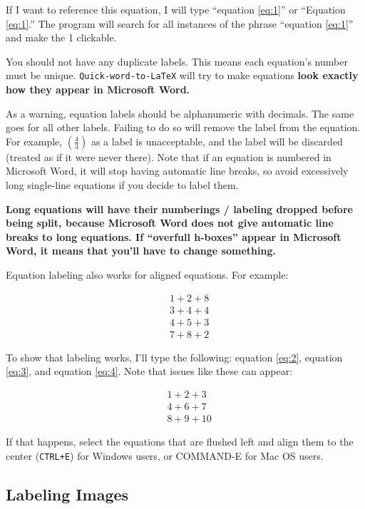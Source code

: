 \documentclass[
]{article}
\theoremstyle{plain}
\theoremstyle{remark}
\theoremstyle{definition}
\begin{document}
If I want to reference this equation, I will type ``equation \ref{eq:1}'' or
``Equation \ref{eq:1}.'' The program will search for all instances of the phrase
``equation \ref{eq:1}'' and make the 1 clickable.

You should not have any duplicate labels. This means each equation's
number must be unique. \texttt{Quick-word-to-LaTeX} will try to make
equations \textbf{look exactly how they appear in Microsoft Word.}

As a warning, equation labels should be alphanumeric with decimals. The
same goes for all other labels. Failing to do so will remove the label
from the equation. For example, \(\left( \frac{4}{3} \right)\) as a
label is unacceptable, and the label will be discarded (treated as if it
were never there). Note that if an equation is numbered in Microsoft
Word, it will stop having automatic line breaks, so avoid excessively
long single-line equations if you decide to label them.

\textbf{Long equations will have their numberings / labeling dropped
before being split, because Microsoft Word does not give automatic line
breaks to long equations. If ``overfull h-boxes'' appear in Microsoft
Word, it means that you'll have to change something.}

Equation labeling also works for aligned equations. For example:

\begin{align*}
&1 + 2 + 8\tag{2} \label{eq:2} \\
&3 + 4 + 4\tag{3} \label{eq:3} \\
&4 + 5 + 3 \\
&7 + 8 + 2\tag{4} \label{eq:4}
\end{align*}


To show that labeling works, I'll type the following: equation \ref{eq:2},
equation \ref{eq:3}, and equation \ref{eq:4}. Note that issues like these can appear:

\begin{align*}
&1 + 2 + 3\tag{5} \label{eq:5} \\
&4 + 6 + 7 \\
&8 + 9 + 10\tag{6} \label{eq:6}
\end{align*}


If that happens, select the equations that are flushed left and align
them to the center (\texttt{CTRL+E}) for Windows users, or COMMAND-E for
Mac OS users.


\subsection{Labeling Images}
\end{document}
